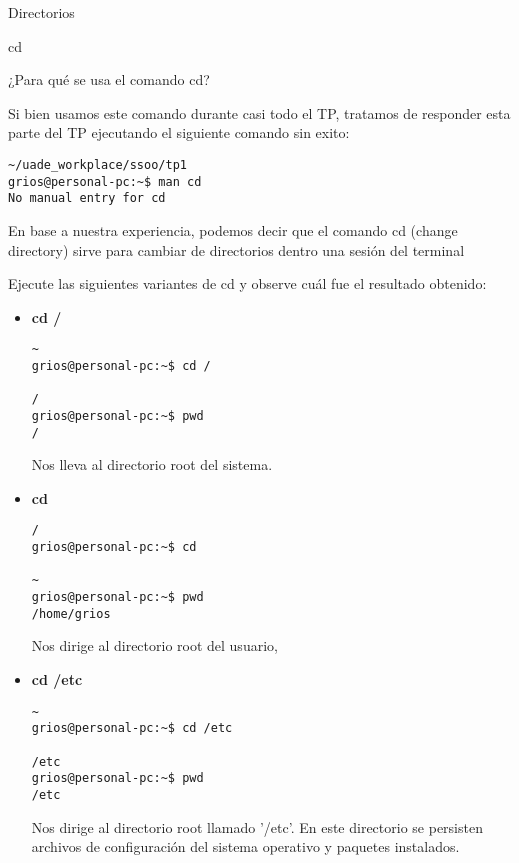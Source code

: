 \begin{section}{Directorios}

\begin{subsection}{cd}

\begin{quoting}
¿Para qué se usa el comando cd?
\end{quoting}

Si bien usamos este comando durante casi todo el TP, tratamos de responder esta parte del TP ejecutando el siguiente comando sin exito:

\begin{lstlisting}[style=Ubuntu]
~/uade_workplace/ssoo/tp1
grios@personal-pc:~$ man cd
No manual entry for cd

\end{lstlisting}

En base a nuestra experiencia, podemos decir que el comando cd (change directory) sirve para cambiar de directorios dentro una sesión del terminal\\

\begin{quoting}
Ejecute las siguientes variantes de cd y observe cuál fue el resultado
obtenido:
\end{quoting}

\begin{itemize}
\item \textbf{cd /}

\begin{lstlisting}[style=Ubuntu]
~
grios@personal-pc:~$ cd /

/
grios@personal-pc:~$ pwd
/
\end{lstlisting}
Nos lleva al directorio root del sistema.

\item \textbf{cd}
\begin{lstlisting}[style=Ubuntu]
/
grios@personal-pc:~$ cd 

~
grios@personal-pc:~$ pwd
/home/grios
\end{lstlisting}
Nos dirige al directorio root del usuario,

\item \textbf{cd /etc}
\begin{lstlisting}[style=Ubuntu]
~
grios@personal-pc:~$ cd /etc

/etc
grios@personal-pc:~$ pwd
/etc
\end{lstlisting}
Nos dirige al directorio root llamado '/etc'. En este directorio se persisten archivos de configuración del sistema operativo y paquetes instalados.


\end{itemize}
\end{subsection}
\end{section}

